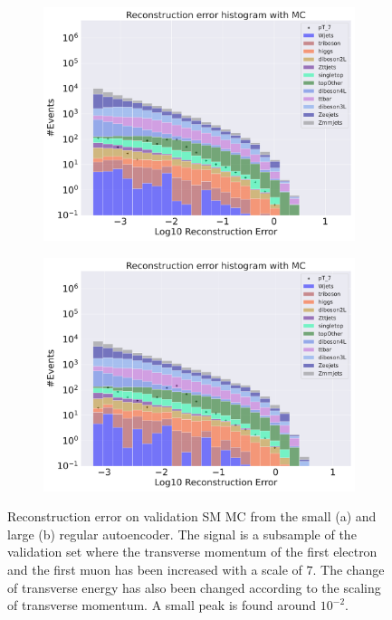 \begin{figure}[H]
    \centering
    \begin{subfigure}{.45\textwidth}
        \includegraphics[width=\textwidth]{Figures/AE_testing/small/b_data_recon_big_rm3_feats_sig_pT_7.pdf}
        \caption{ }
        \label{fig:ae_small_pt_7}
    \end{subfigure}
    \hfill 
    \begin{subfigure}{.45\textwidth}
        \includegraphics[width=\textwidth]{Figures/AE_testing/big/b_data_recon_big_rm3_feats_sig_pT_7.pdf}
        \caption{ }
        \label{fig:ae_big_pt_7}
    \end{subfigure}
    \hfill 
    \caption[AE | Reconstruction error $p_T$ altering of 7]{Reconstruction error on validation SM MC from the small (a) and large (b) regular autoencoder. The signal is a subsample of the validation 
    set where the transverse momentum of the first electron and the first muon has been increased with a scale of $7$. The change of transverse 
    energy has also been changed according to the scaling of transverse momentum. A small peak is found around $10^{-2}$. }
    \label{fig:ae_big_small_pt_7}
\end{figure}


